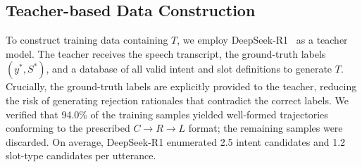 \documentclass[cameraready]{Interspeech}
\begin{document}
\subsection{Teacher-based Data Construction}
To construct training data containing $T$, we employ
DeepSeek-R1~\cite{Guo_2025} as a teacher model.
The teacher receives the speech transcript, the ground-truth labels
$(y^*, S^*)$, and a database of all valid intent and slot definitions
to generate $T$.
Crucially, the ground-truth labels are explicitly provided to the
teacher, reducing the risk of generating rejection rationales that
contradict the correct labels.
We verified that 94.0\% of the training samples yielded well-formed
trajectories conforming to the prescribed $C \to R \to L$ format;
the remaining samples were discarded.
On average, DeepSeek-R1 enumerated 2.5 intent candidates and
1.2 slot-type candidates per utterance.
\end{document}
